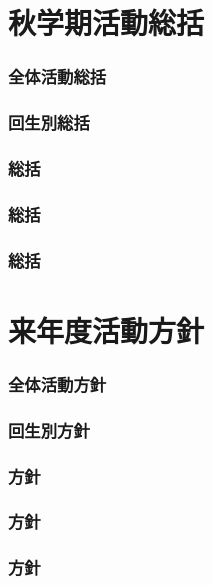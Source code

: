 \part{秋学期活動総括}
\section{全体活動総括}


\section{回生別総括}





\section{\kensuiDepartment{}総括}

\section{\syogaiDepartment{}総括}

\section{\systemDepartment{}総括}


\newpage
\part{来年度活動方針}
\section{全体活動方針}


\section{回生別方針}




\section{\kensuiDepartment{}方針}

\section{\syogaiDepartment{}方針}

\section{\systemDepartment{}方針}
